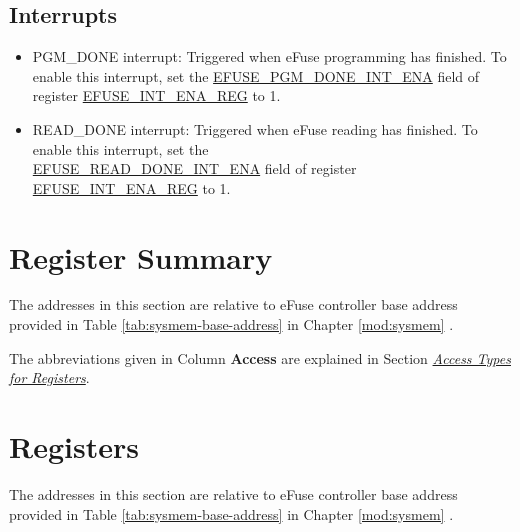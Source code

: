\documentclass[main\_\_EN.tex]{subfiles}
\begin{document}
\subsection{Interrupts}
\begin{itemize}
\item PGM\_DONE interrupt: Triggered when eFuse programming has finished. To enable this interrupt, set the \hyperref[fielddesc:EFUSEPGMDONEINTENA]{EFUSE\_PGM\_DONE\_INT\_ENA} field of register \hyperref[regdesc:EFUSEINTENAREG]{EFUSE\_INT\_ENA\_REG} to 1.
\item READ\_DONE interrupt: Triggered when eFuse reading has finished. To enable this interrupt, set the \\\hyperref[fielddesc:EFUSEREADDONEINTENA]{EFUSE\_READ\_DONE\_INT\_ENA} field of register \hyperref[regdesc:EFUSEINTENAREG]{EFUSE\_INT\_ENA\_REG} to 1.
\end{itemize}





\clearpage
\section{Register Summary}
\label{sec:efuse-reg-summ}
\hypertarget{efuse-reg-summ}{}

The addresses in this section are relative to eFuse controller base address provided in Table \ref{tab:sysmem-base-address} in Chapter \ref{mod:sysmem} \textit{}.

The abbreviations given in Column \textbf{Access} are explained in Section \hyperref[glossary-access-types]{\textit{Access Types for Registers}}.






\clearpage
\section{Registers}
\label{sec:register}

The addresses in this section are relative to eFuse controller base address provided in Table \ref{tab:sysmem-base-address} in Chapter \ref{mod:sysmem} \textit{}.


\end{document}
